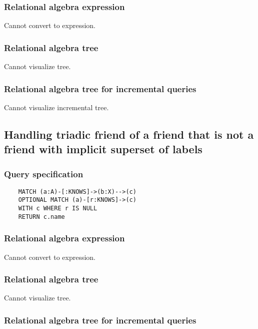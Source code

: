 	\subsubsection*{Relational algebra expression}

	Cannot convert to expression.

	\subsubsection*{Relational algebra tree}

	Cannot visualize tree.

	\subsubsection*{Relational algebra tree for incremental queries}

	Cannot visualize incremental tree.
	\subsection{Handling triadic friend of a friend that is not a friend with implicit superset of labels}

	\subsubsection*{Query specification}

	\begin{lstlisting}
	MATCH (a:A)-[:KNOWS]->(b:X)-->(c)
	OPTIONAL MATCH (a)-[r:KNOWS]->(c)
	WITH c WHERE r IS NULL
	RETURN c.name
	\end{lstlisting}


	\subsubsection*{Relational algebra expression}

	Cannot convert to expression.

	\subsubsection*{Relational algebra tree}

	Cannot visualize tree.

	\subsubsection*{Relational algebra tree for incremental queries}

